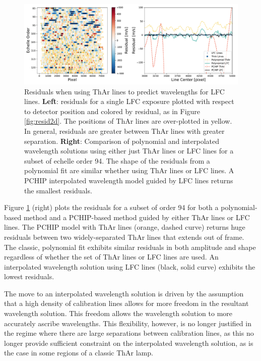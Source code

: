 \documentclass[twocolumn,table,xcolor,trackchanges]{aastex63}
\begin{document}
\begin{figure}[t]
\centering
\includegraphics[width=\textwidth]{Figures/lineDensity.pdf}
\caption{Residuals when using ThAr lines to predict wavelengths for LFC lines.  \textbf{Left}: residuals for a single LFC exposure plotted with respect to detector position and colored by residual, as in Figure \ref{fig:resid2d}.  The positions of ThAr lines are over-plotted in yellow.  In general, residuals are greater between ThAr lines with greater separation.
\textbf{Right}: Comparison of polynomial and interpolated wavelength solutions using either just ThAr lines or LFC lines for a subset of echelle order 94.  The shape of the residuals from a polynomial fit are similar whether using ThAr lines or LFC lines.  A PCHIP interpolated wavelength model guided by LFC lines returns the smallest residuals.}
\label{fig:waveResids}
\end{figure}

Figure \ref{fig:waveResids} (right) plots the residuals for a subset of order 94 for both a polynomial-based method and a PCHIP-based method guided by either ThAr lines or LFC lines.   The PCHIP model with ThAr lines (orange, dashed curve) returns huge residuals between two widely-separated ThAr lines that extends out of frame.  The classic, polynomial fit exhibits similar residuals in both amplitude and shape regardless of whether the set of ThAr lines or LFC lines are used.  An interpolated wavelength solution using LFC lines (black, solid curve) exhibits the lowest residuals.

The move to an interpolated wavelength solution is driven by the assumption that a high density of calibration lines allows for more freedom in the resultant wavelength solution.  This freedom allows the wavelength solution to more accurately ascribe wavelengths.  This flexibility, however, is no longer justified in the regime where there are large separations between calibration lines, as this no longer provide sufficient constraint on the interpolated wavelength solution, as is the case in some regions of a classic ThAr lamp.
\end{document}
